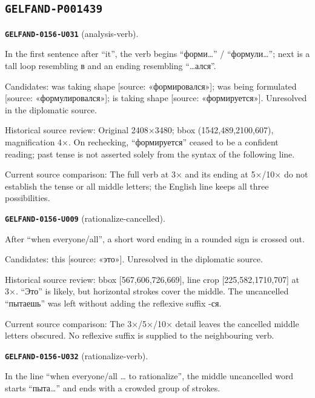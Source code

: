 \subsection*{\texttt{GELFAND-P001439}}
\par\noindent\leavevmode{}\label{GELFAND-0156-U031}\label{GELFAND-P001439:analysis-verb}\textbf{\texttt{GELFAND-0156-U031}} (analysis-verb).\nopagebreak[4]\par
In the first sentence after “it”, the verb begins “форми…” / “формули…”; next is a tall loop resembling в and an ending resembling “…ался”.\par
Candidates: was taking shape [source: «формировался»]; was being formulated [source: «формулировался»]; is taking shape [source: «формируется»]. Unresolved in the diplomatic source.\par
Historical source review: Original 2408×3480; bbox (1542,489,2100,607), magnification 4×. On rechecking, “формируется” ceased to be a confident reading; past tense is not asserted solely from the syntax of the following line.\par
Current source comparison: The full verb at 3× and its ending at 5×/10× do not establish the tense or all middle letters; the English line keeps all three possibilities.\par\medskip
\par\noindent\leavevmode{}\label{GELFAND-0156-U009}\label{GELFAND-P001439:rationalize-cancelled}\textbf{\texttt{GELFAND-0156-U009}} (rationalize-cancelled).\nopagebreak[4]\par
After “when everyone/all”, a short word ending in a rounded sign is crossed out.\par
Candidates: this [source: «это»]. Unresolved in the diplomatic source.\par
Historical source review: bbox [567,606,726,669], line crop [225,582,1710,707] at 3×. “Это” is likely, but horizontal strokes cover the middle. The uncancelled “пытаешь” was left without adding the reflexive suffix -ся.\par
Current source comparison: The 3×/5×/10× detail leaves the cancelled middle letters obscured. No reflexive suffix is supplied to the neighbouring verb.\par\medskip
\par\noindent\leavevmode{}\label{GELFAND-0156-U032}\label{GELFAND-P001439:rationalize-verb}\textbf{\texttt{GELFAND-0156-U032}} (rationalize-verb).\nopagebreak[4]\par
In the line “when everyone/all … to rationalize”, the middle uncancelled word starts “пыта…” and ends with a crowded group of strokes.\par
